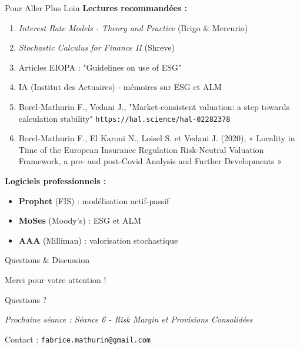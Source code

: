 \documentclass[10pt,aspectratio=169,xcolor={dvipsnames}]{beamer}
\begin{document}
\begin{frame}{Pour Aller Plus Loin}
\textbf{Lectures recommandées :}

\begin{enumerate}
    \item \textit{Interest Rate Models - Theory and Practice} (Brigo \& Mercurio)
    \item \textit{Stochastic Calculus for Finance II} (Shreve)
    \item Articles EIOPA : "Guidelines on use of ESG"
    \item IA (Institut des Actuaires) - mémoires sur ESG et ALM
    \item Borel-Mathurin F., Vedani J., "Market-consistent valuation: a step towards calculation stability" \texttt{https://hal.science/hal-02282378}
    \item Borel-Mathurin F., El Karoui N., Loisel S. et Vedani J. (2020), « Locality in Time of the European
Insurance Regulation Risk-Neutral Valuation Framework, a pre- and post-Covid Analysis and Further Developments »
\end{enumerate}

\vspace{0.3cm}
\textbf{Logiciels professionnels :}
\begin{itemize}
    \item \textbf{Prophet} (FIS) : modélisation actif-passif
    \item \textbf{MoSes} (Moody's) : ESG et ALM
    \item \textbf{AAA} (Milliman) : valorisation stochastique
\end{itemize}

\end{frame}

\begin{frame}{Questions \& Discussion}
\begin{center}
\Huge Merci pour votre attention !
\vspace{1cm}

\Large Questions ?

\vspace{1cm}

\normalsize
\textit{Prochaine séance : Séance 6 - Risk Margin et Provisions Consolidées}

\vspace{0.5cm}

Contact : \texttt{fabrice.mathurin@gmail.com}
\end{center}
\end{frame}
\end{document}
